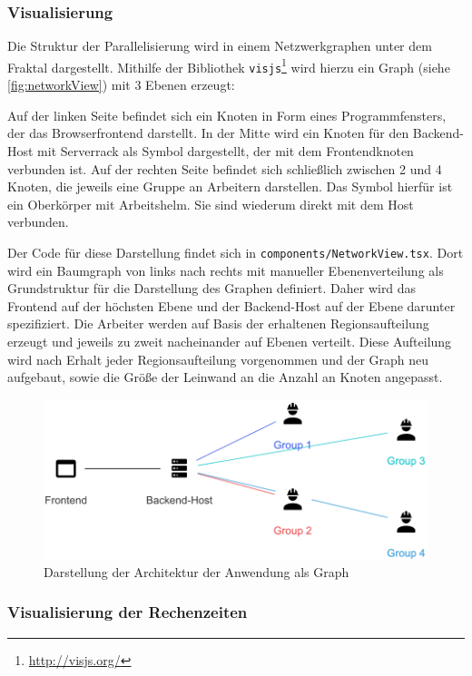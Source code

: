 \subsubsection{Visualisierung}

Die Struktur der Parallelisierung wird in einem Netzwerkgraphen unter dem Fraktal dargestellt.
Mithilfe der Bibliothek \verb|visjs|\footnote{\url{http://visjs.org/}} wird hierzu ein
Graph (siehe \autoref{fig:networkView}) mit 3 Ebenen erzeugt:

Auf der linken Seite befindet sich ein Knoten in Form eines Programmfensters, der das Browserfrontend darstellt.
In der Mitte wird ein Knoten für den Backend-Host mit Serverrack als Symbol dargestellt, der mit dem Frontendknoten verbunden ist.
Auf der rechten Seite befindet sich schließlich zwischen 2 und 4 Knoten, die jeweils eine Gruppe an Arbeitern
darstellen. Das Symbol hierfür ist ein Oberkörper mit Arbeitshelm.
Sie sind wiederum direkt mit dem Host verbunden.

Der Code für diese Darstellung findet sich in \verb|components/NetworkView.tsx|.
Dort wird ein Baumgraph von links nach rechts mit manueller Ebenenverteilung als Grundstruktur für die Darstellung des Graphen definiert.
Daher wird das Frontend auf der höchsten Ebene und der Backend-Host auf der Ebene darunter spezifiziert.
Die Arbeiter werden auf Basis der erhaltenen Regionsaufteilung erzeugt und jeweils zu zweit nacheinander
auf Ebenen verteilt.
Diese Aufteilung wird nach Erhalt jeder Regionsaufteilung vorgenommen und der Graph neu aufgebaut,
sowie die Größe der Leinwand an die Anzahl an Knoten angepasst.

\begin{figure}
	\centering
	\includegraphics[width=0.5\linewidth]{img/Implementierung/NetworkView}
	\caption{Darstellung der Architektur der Anwendung als Graph
	}\label{fig:networkView}
\end{figure}

\subsubsection{Visualisierung der Rechenzeiten} %


